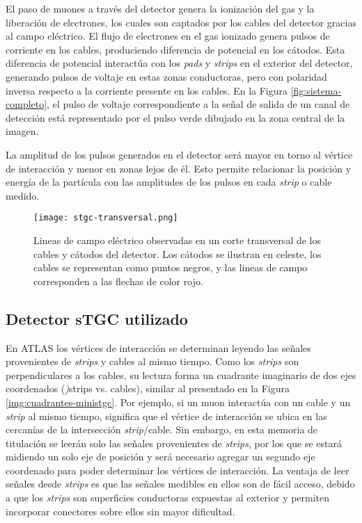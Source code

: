 	El paso de muones a través del detector genera la ionización del gas y la liberación de electrones, los cuales son captados por los cables del detector gracias al campo eléctrico. El flujo de electrones en el gas ionizado genera pulsos de corriente en los cables, produciendo diferencia de potencial en los cátodos. Esta diferencia de potencial interactúa con los \textit{pads} y \textit{strips} en el exterior del detector, generando pulsos de voltaje en estas zonas conductoras, pero con polaridad inversa respecto a la corriente presente en los cables. En la Figura \ref{fig:sistema-completo}, el pulso de voltaje correspondiente a la señal de salida de un canal de detección está representado por el pulso verde dibujado en la zona central de la imagen.
	
	La amplitud de los pulsos generados en el detector será mayor en torno al vértice de interacción y menor en zonas lejos de él. Esto permite relacionar la posición y energía de la partícula con las amplitudes de los pulsos en cada \textit{strip} o cable medido.
	
	\begin{figure}[h]
		\centering
		\texttt{[image: stgc-transversal.png]}
		\caption{Lineas de campo eléctrico observadas en un corte transversal de los cables y cátodos del detector. Los cátodos se ilustran en celeste, los cables se representan como puntos negros, y las lineas de campo corresponden a las flechas de color rojo\cite{DeSmet2011StudyLab}.}
		\label{img:stgc-field}
	\end{figure}

\subsection{Detector sTGC utilizado}
	En ATLAS los vértices de interacción se determinan leyendo las señales provenientes de \textit{strips} y cables al mismo tiempo. Como los \textit{strips} son perpendiculares a los cables, su lectura forma un cuadrante imaginario de dos ejes coordenados (\textit){strips} vs. cables), similar al presentado en la Figura \ref{img:cuadrantes-ministgc}. Por ejemplo,    si un muon interactúa con un cable y un \textit{strip} al mismo tiempo, significa que el vértice de interacción se ubica en las cercanías de la intersección \textit{strip}/cable. Sin embargo, en esta memoria de titulación se leerán solo las señales provenientes de \textit{strips}, por los que se estará midiendo un solo eje de posición y será necesario agregar un segundo eje coordenado para poder determinar los vértices de interacción. La ventaja de leer señales desde \textit{strips} es que las señales medibles en ellos son de fácil acceso, debido a que los \textit{strips} son superficies conductoras expuestas al exterior y permiten incorporar conectores sobre ellos sin mayor dificultad.
	
